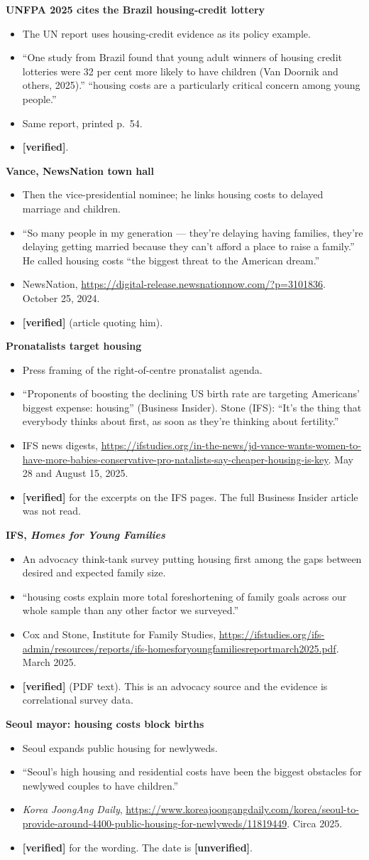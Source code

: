 \documentclass[10pt]{article}
\newcommand{\ok}{\textcolor{green!45!black}{\textbf{[verified]}}}
\newcommand{\unv}{\textcolor{red!70!black}{\textbf{[unverified]}}}
\newcommand{\entry}[5]{%
  \textbf{#1}\par
  \begin{itemize}
    \item #2
    \item #3
    \item #4
    \item #5
  \end{itemize}}
\begin{document}
\entry{UNFPA 2025 cites the Brazil housing-credit lottery}
{The UN report uses housing-credit evidence as its policy example.}
{``One study from Brazil found that young adult winners of housing credit lotteries were 32 per cent more likely to have children (Van Doornik and others, 2025).'' ``housing costs are a particularly critical concern among young people.''}
{Same report, printed p.~54.}
{\ok.}

\entry{Vance, NewsNation town hall}
{Then the vice-presidential nominee; he links housing costs to delayed marriage and children.}
{``So many people in my generation --- they're delaying having families, they're delaying getting married because they can't afford a place to raise a family.'' He called housing costs ``the biggest threat to the American dream.''}
{NewsNation, \url{https://digital-release.newsnationnow.com/?p=3101836}. October 25, 2024.}
{\ok{} (article quoting him).}

\entry{Pronatalists target housing}
{Press framing of the right-of-centre pronatalist agenda.}
{``Proponents of boosting the declining US birth rate are targeting Americans' biggest expense: housing'' (Business Insider). Stone (IFS): ``It's the thing that everybody thinks about first, as soon as they're thinking about fertility.''}
{IFS news digests, \url{https://ifstudies.org/in-the-news/jd-vance-wants-women-to-have-more-babies-conservative-pro-natalists-say-cheaper-housing-is-key}. May 28 and August 15, 2025.}
{\ok{} for the excerpts on the IFS pages. The full Business Insider article was not read.}

\entry{IFS, \emph{Homes for Young Families}}
{An advocacy think-tank survey putting housing first among the gaps between desired and expected family size.}
{``housing costs explain more total foreshortening of family goals across our whole sample than any other factor we surveyed.''}
{Cox and Stone, Institute for Family Studies, \url{https://ifstudies.org/ifs-admin/resources/reports/ifs-homesforyoungfamiliesreportmarch2025.pdf}. March 2025.}
{\ok{} (PDF text). This is an advocacy source and the evidence is correlational survey data.}

\entry{Seoul mayor: housing costs block births}
{Seoul expands public housing for newlyweds.}
{``Seoul's high housing and residential costs have been the biggest obstacles for newlywed couples to have children.''}
{\emph{Korea JoongAng Daily}, \url{https://www.koreajoongangdaily.com/korea/seoul-to-provide-around-4400-public-housing-for-newlyweds/11819449}. Circa 2025.}
{\ok{} for the wording. The date is \unv.}
\end{document}
